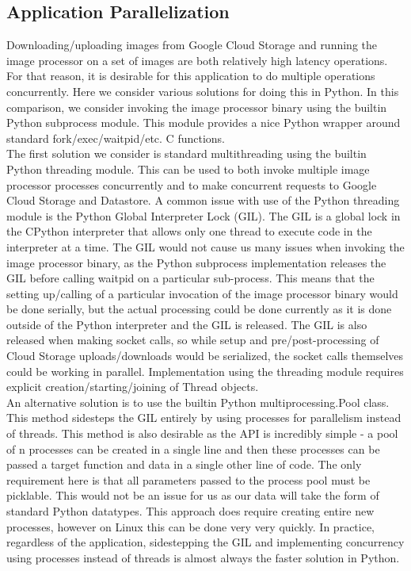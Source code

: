 \documentclass[10pt, onecolumn, draftclsnofoot, letterpaper, compsoc]{IEEEtran}
\begin{document}
\subsection{Application Parallelization}

Downloading/uploading images from Google Cloud Storage and running the 
image processor on a set of images are both relatively high latency operations. 
For that reason, it is desirable for this application to do multiple operations 
concurrently. Here we consider various solutions for doing this in Python. In 
this comparison, we consider invoking the image processor binary using the 
builtin Python subprocess module. This module provides a nice Python wrapper 
around standard fork/exec/waitpid/etc. C functions. \\

The first solution we consider is standard multithreading using the builtin 
Python threading module. This can be used to both invoke multiple image 
processor processes concurrently and to make concurrent requests to Google 
Cloud Storage and Datastore. A common issue with use of the Python threading 
module is the Python Global Interpreter Lock (GIL)\cite{gilArticle}. The GIL 
is a global lock in the CPython interpreter that allows only one thread to 
execute code in the interpreter at a time\cite{gilArticle}. The GIL would 
not cause us many issues when invoking the image processor binary, as 
the Python subprocess implementation releases the GIL before calling 
waitpid on a particular sub-process. This means that the 
setting up/calling of a particular invocation of the image processor binary 
would be done serially, but the actual processing could be done currently as 
it is done outside of the Python interpreter and the GIL is released\cite{gilArticle}. 
The GIL is also released when making socket calls, so while setup and 
pre/post-processing of Cloud Storage uploads/downloads would be 
serialized, the socket calls themselves could be working in parallel\cite{gilArticle}. 
Implementation using the threading module requires explicit 
creation/starting/joining of Thread objects. \\

An alternative solution is to use the builtin Python multiprocessing.Pool 
class. This method sidesteps the GIL entirely by using processes for 
parallelism instead of threads\cite{multiproc}. This method is also desirable 
as the API is incredibly simple - a pool of n processes can be created in a 
single line and then these processes can be passed a target function and 
data in a single other line of code\cite{multiproc}. The only requirement 
here is that all parameters passed to the process pool must be picklable\cite{multiproc}. 
This would not be an issue for us as our data will take the form of standard 
Python datatypes. This approach does require creating entire new processes, 
however on Linux this can be done very very quickly. In practice, regardless 
of the application, sidestepping the GIL and implementing concurrency using 
processes instead of threads is almost always the faster solution in Python. \\
\end{document}
